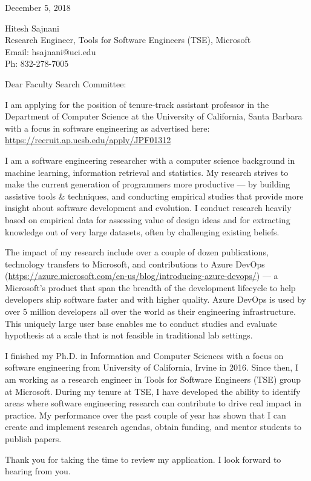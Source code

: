 \documentclass{article}
\begin{document}
December 5, 2018
\bigskip

Hitesh Sajnani \\
Research Engineer, Tools for Software Engineers (TSE), Microsoft \\
Email: hsajnani@uci.edu \\
Ph: 832-278-7005

\bigskip
Dear Faculty Search Committee:

I am applying for the position of tenure-track assistant professor in the Department of Computer Science at the University of California, Santa Barbara with a focus in software engineering as advertised here: 
\url{https://recruit.ap.ucsb.edu/apply/JPF01312}

I am a software engineering researcher with a computer science background in
machine learning, information retrieval and statistics. My research strives to make the current
generation of programmers more productive --- by building assistive tools \& techniques, and conducting 
empirical studies that provide more insight about software development and evolution. I conduct research heavily based on empirical data for assessing value of design ideas and for extracting knowledge out of very large datasets, often by challenging existing beliefs. 

The impact of my research include over a couple of dozen publications, technology transfers to Microsoft, and contributions to Azure DevOps (\url{https://azure.microsoft.com/en-us/blog/introducing-azure-devops/}) --- a Microsoft's product that span the breadth of the development lifecycle to help developers ship software faster and with higher quality. Azure DevOps is used by over 5 million developers all over the world as their engineering infrastructure. This uniquely large user base enables me to conduct studies and evaluate hypothesis at a scale that is not feasible in traditional lab settings.

I finished my Ph.D. in Information and Computer Sciences with a focus on software engineering from University of California, Irvine in 2016. 
Since then, I am working as a research engineer in Tools for Software Engineers (TSE) 
group at Microsoft. During my tenure at TSE,  I have developed the ability to identify areas where software engineering research can contribute
to drive real impact in practice. My performance over the past couple of year has
shown that I can create and implement research agendas, obtain funding, and mentor students to publish papers.

Thank you for taking the time to review my application. I look forward to hearing from you.
\end{document}
